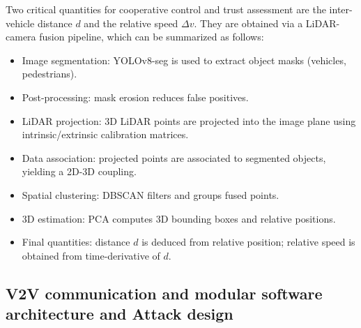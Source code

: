 Two critical quantities for cooperative control and trust assessment are the inter-vehicle distance $d$ and the relative speed $\Delta v$.
They are obtained via a LiDAR-camera fusion pipeline, which can be summarized as follows:
\begin{itemize}
	\item Image segmentation: YOLOv8-seg is used to extract object masks (vehicles, pedestrians).
	\item Post-processing: mask erosion reduces false positives.
	\item LiDAR projection: 3D LiDAR points are projected into the image plane using intrinsic/extrinsic calibration matrices.
	\item Data association: projected points are associated to segmented objects, yielding a 2D-3D coupling.
	\item Spatial clustering: DBSCAN filters and groups fused points.
	\item 3D estimation: PCA computes 3D bounding boxes and relative positions.
	\item Final quantities: distance $d$ is deduced from relative position; relative speed is obtained from time-derivative of $d$.
\end{itemize}



\subsection{V2V communication and modular software architecture and Attack design}\label{chp6_subsec_v2v}
